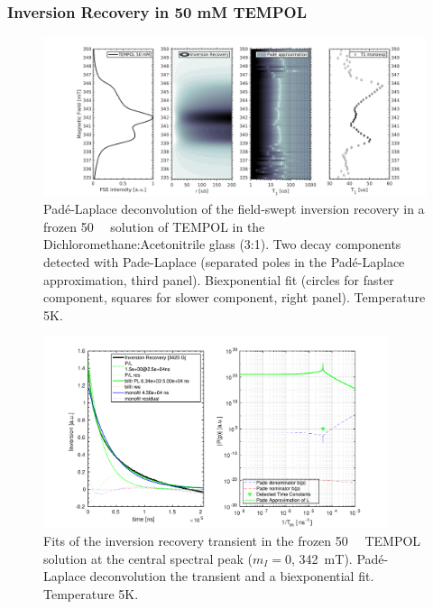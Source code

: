 \subsubsection{Inversion Recovery in 50 mM TEMPOL}
\label{esi:pade_laplace_T1}
\begin{figure}[h]
\center
	\includegraphics[width=1\textwidth]{./pulse/figures/Figure_S14.png}
	\caption{Pad{\'e}-Laplace deconvolution of the field-swept inversion recovery in a frozen 50~\si{\milli\Molar}  solution of TEMPOL in the Dichloromethane:Acetonitrile glass (3:1). Two decay components detected with Pade-Laplace (separated poles in the Pad{\'e}-Laplace approximation, third panel). Biexponential fit (circles for faster component, squares for slower component, right panel). Temperature 5K.}
	\label{fig:Figure_S14}
\end{figure}


\begin{figure}[ht!]
\center
	\includegraphics[width=0.9\textwidth]{./pulse/figures/Figure_S15.pdf}
	\caption{Fits of the inversion recovery transient in the frozen 50~\si{\milli\Molar}  TEMPOL solution at the central spectral peak ($m_I=0$, 342~mT). Pad{\'e}-Laplace deconvolution the transient and a biexponential fit. Temperature 5K.}
	\label{fig:Figure_S15}
\end{figure}



